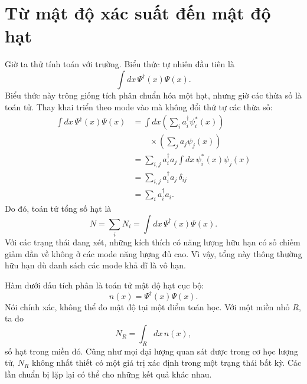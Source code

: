 \begin{classroomqa}
\end{classroomqa}

\begin{classroomqa}
\end{classroomqa}

\section{Từ mật độ xác suất đến mật độ hạt}

Giờ ta thử tính toán với trường. Biểu thức tự nhiên đầu tiên là
\begin{equation}
\int dx\,\Psi^\dagger(x)\Psi(x).
\end{equation}
Biểu thức này trông giống tích phân chuẩn hóa một hạt, nhưng giờ các thừa số là toán tử. Thay khai triển theo mode vào mà không đổi thứ tự các thừa số:
\begin{align}
\int dx\,\Psi^\dagger(x)\Psi(x)
&=\int dx
\left(\sum_i a_i^\dagger\psi_i^*(x)\right)\\
&\qquad\times\left(\sum_j a_j\psi_j(x)\right) \\
&=\sum_{i,j}a_i^\dagger a_j
\int dx\,\psi_i^*(x)\psi_j(x) \\
&=\sum_{i,j}a_i^\dagger a_j\,\delta_{ij} \\
&=\sum_i a_i^\dagger a_i.
\label{eq:l07-number-derivation}
\end{align}
Do đó, toán tử tổng số hạt là
\begin{equation}
N=\sum_i N_i
=\int dx\,\Psi^\dagger(x)\Psi(x).
\label{eq:l07-total-number}
\end{equation}
Với các trạng thái đang xét, những kích thích có năng lượng hữu hạn có số chiếm giảm dần về không ở các mode năng lượng đủ cao. Vì vậy, tổng này thông thường hữu hạn dù danh sách các mode khả dĩ là vô hạn.

Hàm dưới dấu tích phân là toán tử mật độ hạt cục bộ:
\begin{equation}
n(x)=\Psi^\dagger(x)\Psi(x).
\label{eq:l07-density}
\end{equation}
Nói chính xác, không thể đo mật độ tại một điểm toán học. Với một miền nhỏ \(R\), ta đo
\begin{equation}
N_R=\int_R dx\,n(x),
\label{eq:l07-regional-number}
\end{equation}
số hạt trong miền đó. Cũng như mọi đại lượng quan sát được trong cơ học lượng tử, \(N_R\) không nhất thiết có một giá trị xác định trong một trạng thái bất kỳ. Các lần chuẩn bị lặp lại có thể cho những kết quả khác nhau.

